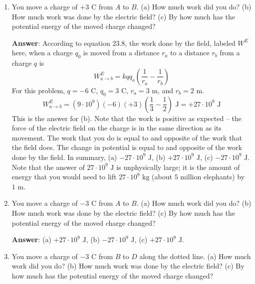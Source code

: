 \documentclass{article}
\begin{document}
\begin{enumerate}

  \item You move a charge of $+3\text{ C}$ from $A$ to $B$. (a) How much work did you do? (b) How much work was done by the electric field? (c) By how much has the potential energy of the moved charge changed?

        \ifsolutions
        \textbf{Answer}: According to equation 23.8, the work done by the field, labeled $W^E$ here, when a charge $q_0$ is moved from a distance $r_a$ to a distance $r_b$ from a charge $q$ is
        \begin{equation}
        W^E_{a\rightarrow b} = kqq_o\left(\frac{1}{r_a}-\frac{1}{r_b}\right)
        \end{equation}
        For this problem, $q=-6\text{ C}$, $q_0=3\text{ C}$, $r_a=3\text{ m}$, and $r_b=2\text{ m}$.
        \begin{equation}
        W^E_{a\rightarrow b} = (9\cdot 10^9)(-6)(+3)\left(\frac{1}{3}-\frac{1}{2}\right)\text{ J} = +27\cdot 10^9\text{ J}
        \end{equation}
        This is the answer for (b). Note that the work is positive as expected -- the force of the electric field on the charge is in the same direction as its movement. The work that you do is equal to and opposite of the work that the field does. The change in potential is equal to and opposite of the work done by the field. In summary, (a) $-27\cdot 10^9\text{ J}$, (b) $+27\cdot 10^9\text{ J}$, (c) $-27\cdot 10^9\text{ J}$. Note that the answer of $27\cdot 10^9\text{ J}$ is unphysically large; it is the amount of energy that you would need to lift $27\cdot 10^9\text{ kg}$ (about $5$ million elephants) by $1\text{ m}$. 
        \else
        \vskip 48pt
        \fi

  \item You move a charge of $-3\text{ C}$ from $A$ to $B$. (a) How much work did you do? (b) How much work was done by the electric field? (c) By how much has the potential energy of the moved charge changed?

        \ifsolutions
        \textbf{Answer}: (a) $+27\cdot 10^9\text{ J}$, (b) $-27\cdot 10^9\text{ J}$, (c) $+27\cdot 10^9\text{ J}$. 
        \else
        \vskip 48pt
        \fi

  \item You move a charge of $-3\text{ C}$ from $B$ to $D$ along the dotted line. (a) How much work did you do? (b) How much work was done by the electric field? (c) By how much has the potential energy of the moved charge changed?


\end{enumerate}
\end{document}
